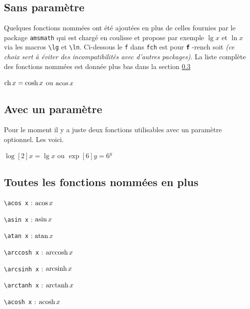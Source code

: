 \documentclass[12pt,a4paper]{book}
\makeatletter
\newcommand\env[1]{\texttt{#1}}
\newcommand\macro[1]{\env{\textbackslash{}#1}}
\theoremstyle{definition}
\newcommand\whyprefix[2]{%
	\textbf{\prefix{#1}}-#2%
}
\newcommand\prefix[1]{%
	\texttt{#1}%
}
\newcommand\inenglish{\@ifstar{\@inenglish@star}{\@inenglish@no@star}}
\newcommand\@inenglish@star[1]{%
	\emph{\og #1 \fg}%
}
\newcommand\@inenglish@no@star[1]{%
	\@inenglish@star{#1} en anglais%
}
\makeatother
\begin{document}
{{\subsection{Sans paramètre}

Quelques fonctions nommées ont été ajoutées en plus de celles fournies par le package \verb#amsmath#  qui est chargé en coulisse et propose par exemple $\lg x$ et $\ln x$ via les macros \macro{lg} et \macro{ln}.
Ci-dessous le \prefix{f} dans \prefix{fch} est pour \whyprefix{f}{rench} soit \inenglish{français} \emph{(ce choix sert à éviter des incompatibilités avec d'autres packages)}. La liste complète des fonctions nommées est donnée plus bas dans la section  \ref{tnsana-all-named-functions}

\begin{latexex}
$\operatorname{\operatorname{ch}} x = \cosh x$ ou $\operatorname{\operatorname{acos}} x$
\end{latexex}




\subsection{Avec un paramètre}

Pour le moment il y a juste deux fonctions utilisables avec un paramètre optionnel. Les voici.

\begin{latexex}
$\log[2] x = \lg x$ ou
$\exp[6] y = 6^y$
\end{latexex}




\subsection{Toutes les fonctions nommées en plus} \label{tnsana-all-named-functions}

\vspace{-1em}

\begin{multicols}{2}
    \macro{acos x} : $\operatorname{\operatorname{acos}} x$

    \macro{asin x} : $\operatorname{\operatorname{asin}} x$

    \macro{atan x} : $\operatorname{\operatorname{atan}} x$

    \macro{arccosh x} : $\operatorname{\operatorname{arccosh}} x$

    \macro{arcsinh x} : $\operatorname{\operatorname{arcsinh}} x$

    \macro{arctanh x} : $\operatorname{\operatorname{arctanh}} x$

    \macro{acosh x} : $\operatorname{\operatorname{acosh}} x$


\end{multicols}}}
\end{document}
